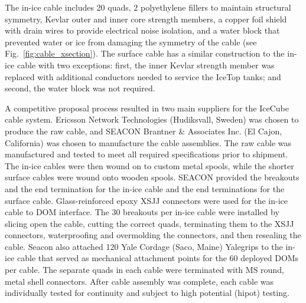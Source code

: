 The in-ice cable includes 20 quads, 2 polyethylene fillers to maintain structural
symmetry, Kevlar outer and inner core strength members, a copper foil
shield with drain wires to provide electrical noise isolation, and a water
block that prevented water or ice from damaging the symmetry of the
cable (see Fig.~\ref{fig:cable_xsection}). The surface cable has a similar
construction to the in-ice 
cable with two exceptions: first, the inner Kevlar strength member was replaced
with additional conductors needed to service the IceTop tanks; and second, the
water block was not required.

A competitive proposal process resulted in two main suppliers for the IceCube
cable system.  Ericsson Network Technologies (Hudiksvall, Sweden) was chosen
to produce the raw cable, and SEACON Brantner \& Associates Inc. (El Cajon,
California) was chosen to manufacture the cable assemblies. The raw
cable was manufactured and tested to meet all required specifications prior
to shipment.  The in-ice cables were then
wound on to custom metal spools, while the shorter surface cables were wound
onto wooden spools. SEACON provided the breakouts
and the end termination for the in-ice cable and the end
terminations for the surface cable.  Glass-reinforced epoxy XSJJ
connectors were used for the in-ice
cable to DOM interface. The 30 breakouts per in-ice cable were installed by
slicing open the cable, cutting the correct quads, terminating them to the
XSJJ connectors, waterproofing and overmolding the connectors, and then
resealing the cable. Seacon also
attached 120 Yale Cordage (Saco, Maine) Yalegrips to the in-ice
cable that served as mechanical attachment points for the 60 deployed DOMs
per cable. The separate quads in each cable were terminated with MS round,
metal shell connectors. After cable assembly was complete, 
each cable was individually tested for continuity and subject to high
potential (hipot) testing. 

